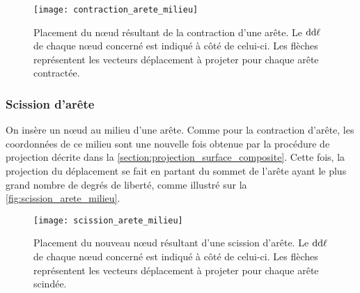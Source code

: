 \setlength{\imagewidth}{50mm}
\begin{figure}
  \centering
  \texttt{[image: contraction\_arete\_milieu]}
  \caption{Placement du n\oe ud résultant de la contraction d'une arête. Le $\mathrm{dd}\ell$ de chaque n\oe ud concerné est indiqué à côté de celui-ci. Les flèches représentent les vecteurs déplacement à projeter pour chaque arête contractée.}
  \label{fig:contraction_arete_milieu}
\end{figure}


\subsubsection{Scission d'arête}
On insère un n\oe ud au milieu d'une arête. Comme pour la contraction d'arête, les coordonnées de ce milieu sont une nouvelle fois obtenue par la procédure de projection décrite dans la \autoref{section:projection_surface_composite}.
Cette fois, la projection du déplacement se fait en partant du sommet de l'arête ayant le plus grand nombre de degrés de liberté, comme illustré sur la \autoref{fig:scission_arete_milieu}.

\setlength{\imagewidth}{50mm}
\begin{figure}
  \centering
  \texttt{[image: scission\_arete\_milieu]}
  \caption{Placement du nouveau n\oe ud résultant d'une scission d'arête. Le $\mathrm{dd}\ell$ de chaque n\oe ud concerné est indiqué à côté de celui-ci. Les flèches représentent les vecteurs déplacement à projeter pour chaque arête scindée.}
  \label{fig:scission_arete_milieu}
\end{figure}
